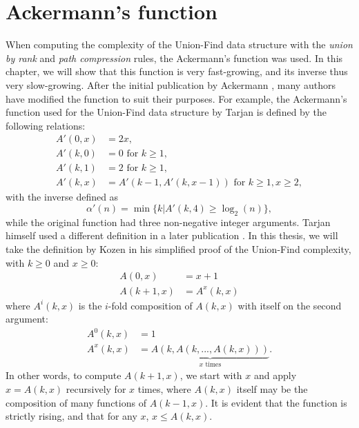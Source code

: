 \chapter{Ackermann's function}\label{ap:ackermann}
When computing the complexity of the Union-Find data structure \cite{tarjan1975efficiency} with the \emph{union by rank} and \emph{path compression} rules, the Ackermann's function was used. In this chapter, we will show that this function is very fast-growing, and its inverse thus very slow-growing. After the initial publication by Ackermann \cite{ackermann1928hilbertschen}, many authors have modified the function to suit their purposes. For example, the Ackermann's function used for the Union-Find data structure by Tarjan \cite{tarjan1975efficiency} is defined by the following relations:
\begin{align*}
    A'(0,x) &= 2x, \\
    A'(k,0) &= 0 \text{ for } k \geq 1, \\
    A'(k,1) &= 2 \text{ for } k \geq 1, \\
    A'(k,x) &= A'(k-1, A'(k, x-1)) \text{ for } k \geq 1, x \geq 2,
\end{align*}
with the inverse defined as
\begin{equation*}
    \alpha'(n) = \min \{k | A'(k,4) \geq \log_2(n)\}, 
\end{equation*}
while the original function had three non-negative integer arguments. Tarjan himself used a different definition in a later publication \cite{tarjan1984worst}. In this thesis, we will take the definition by Kozen \cite{kozen1992design} in his simplified proof of the Union-Find complexity, with $k\geq 0$ and $x\geq 0$:
\begin{align}
    \nonumber A(0,x) &= x + 1\\
    A(k+1,x) &= A^x(k,x)
\end{align}
where $A^i(k,x)$ is the $i$-fold composition of $A(k,x)$ with itself on the second argument:
\begin{align}
    \nonumber  A^0(k,x) &= 1 \\
    A^x(k,x) &= \underbrace{A(k, A(k, ..., A(k,x)))}_{x \text{ times}}.
\end{align}
In other words, to compute $A(k+1,x)$, we start with $x$ and apply $x=A(k,x)$ recursively for $x$ times, where $A(k,x)$ itself may be the composition of many functions of $A(k-1,x)$. It is evident that the function is strictly rising, and that for any $x$, $x\leq A(k,x)$. 


